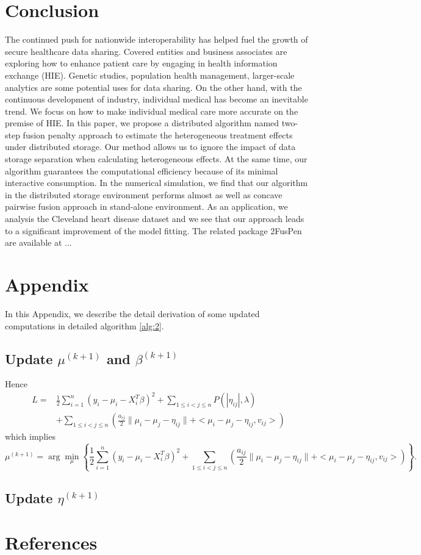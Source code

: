 \documentclass[review]{elsarticle}
\begin{document}
\section{Conclusion}
The continued push for nationwide interoperability has helped fuel the growth of secure healthcare data sharing. Covered entities and business associates are exploring how to enhance patient care by engaging in health information exchange (HIE). Genetic studies,  population health management, larger-scale analytics are some potential uses for data sharing. On the other hand, with the continuous development of industry, individual medical has become an inevitable trend. We focus on how to make individual medical care more accurate on the premise of HIE. In this paper, we propose a distributed algorithm named two-step fusion penalty approach to estimate the heterogeneous treatment effects under distributed storage. Our method allows us to ignore the impact of data storage separation when calculating heterogeneous effects. At the same time, our algorithm guarantees the computational efficiency because of its minimal interactive consumption. In the numerical simulation, we find that our algorithm in the distributed storage environment performs almost as well as concave pairwise fusion approach in stand-alone environment. As an application, we analysis the Cleveland heart disease dataset and we see that our approach leads to a significant improvement of the model fitting. The related package 2FusPen are available at ...
\section{Appendix}
In this Appendix, we describe the detail derivation of some updated computations in detailed algorithm \ref{alg:2}.
\subsection{Update $\mu^{(k+1)}$ and $\beta^{(k+1)}$}
Hence 
$$
\begin{aligned}
L=&\frac{1}{2}\sum_{i=1}^n(y_i-\mu_i-X_i^T\beta)^2+\sum_{1\leq i<j\leq n}P(|\eta_{ij}|,\lambda)\\
&+\sum_{1\leq i<j\leq n}(\frac{a_{ij}}{2}\lVert \mu_i-\mu_j-\eta_{ij}\rVert+<\mu_i-\mu_j-\eta_{ij}, v_{ij}>)
\end{aligned}
$$
which implies
$$
\mu^{(k+1)}=\arg\min_{\mu}\left\{\frac{1}{2}\sum_{i=1}^n(y_i-\mu_i-X_i^T\beta)^2+\sum_{1\leq i<j\leq n}(\frac{a_{ij}}{2}\lVert \mu_i-\mu_j-\eta_{ij}\rVert+<\mu_i-\mu_j-\eta_{ij}, v_{ij}>)\right\}.
$$

\subsection{Update $\eta^{(k+1)}$}

\section*{References}


\end{document}
